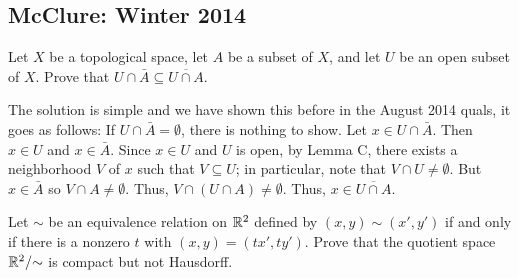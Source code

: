 \subsection{McClure:  Winter 2014}
\setcounter{exercise}{0}
\begin{problem}
  Let $X$ be a topological space, let $A$ be a subset of $X$, and let $U$
  be an open subset of $X$. Prove that
  $U\cap\bar A\subseteq\overline{U\cap A}$.
\end{problem}
\begin{solution}
  The solution is simple and we have shown this before in the August 2014
  quals, it goes as follows: If $U\cap\bar A=\emptyset$, there is nothing
  to show. Let $x\in U\cap\bar A$. Then $x\in U$ and $x\in\bar A$. Since
  $x\in U$ and $U$ is open, by Lemma C, there exists a neighborhood $V$ of
  $x$ such that $V\subseteq U$; in particular, note that
  $V\cap U\neq\emptyset$. But $x\in\bar A$ so $V\cap A\neq\emptyset$. Thus,
  $V\cap(U\cap A)\neq\emptyset$. Thus, $x\in\overline{U\cap A}$.
\end{solution}
\begin{problem}
  Let $\sim$ be an equivalence relation on $\mathbb{R}^2$ defined by
  $(x,y)\sim(x',y')$ if and only if there is a nonzero $t$ with
  $(x,y)=(tx',ty')$. Prove that the quotient space $\mathbb{R}^2/{\sim}$ is
  compact but not Hausdorff.
\end{problem}
